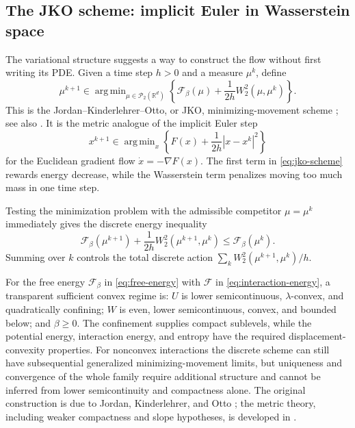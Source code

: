 \documentclass[11pt]{amsart}
\numberwithin{equation}{section}
\theoremstyle{plain}
\newcommand{\R}{\mathbb{R}}
\newcommand{\cP}{\mathcal{P}}
\DeclareMathOperator*{\argmin}{arg\,min}
\begin{document}
\subsection{The JKO scheme: implicit Euler in Wasserstein space}

The variational structure suggests a way to construct the flow without
first writing its PDE.  Given a time step $h>0$ and a measure $\mu^k$, define
\begin{equation}\label{eq:jko-scheme}
 \mu^{k+1}\in\argmin_{\mu\in\cP_2(\R^d)}
 \left\{\mathcal F_\beta(\mu)
       +\frac1{2h}W_2^2(\mu,\mu^k)\right\}.
\end{equation}
This is the Jordan--Kinderlehrer--Otto, or JKO, minimizing-movement scheme
\cite{JordanKinderlehrerOtto1998}; see also
\cite{AmbrosioGigliSavare2008}.  It is the metric analogue of the implicit
Euler step
\[
 x^{k+1}\in\argmin_x
 \left\{F(x)+\frac1{2h}|x-x^k|^2\right\}
\]
for the Euclidean gradient flow $\dot x=-\nabla F(x)$.  The first term in
\eqref{eq:jko-scheme} rewards energy decrease, while the Wasserstein term
penalizes moving too much mass in one time step.

Testing the minimization problem with the admissible competitor
$\mu=\mu^k$ immediately gives the discrete energy inequality
\begin{equation}\label{eq:jko-energy-inequality}
 \mathcal F_\beta(\mu^{k+1})
 +\frac1{2h}W_2^2(\mu^{k+1},\mu^k)
 \leq\mathcal F_\beta(\mu^k).
\end{equation}
Summing over $k$ controls the total discrete action
$\sum_k W_2^2(\mu^{k+1},\mu^k)/h$.

For the free energy $\mathcal F_\beta$ in \eqref{eq:free-energy} with $\mathcal F$  in \eqref{eq:interaction-energy}, a transparent sufficient
convex regime is: $U$ is lower semicontinuous, $\lambda$-convex, and
quadratically confining; $W$ is even, lower semicontinuous, convex, and
bounded below; and $\beta\geq0$.  The confinement supplies compact sublevels,
while the potential energy, interaction energy, and entropy have the required
displacement-convexity properties.  For nonconvex interactions the discrete scheme can still have
subsequential generalized minimizing-movement limits, but uniqueness and
convergence of the whole family require additional structure and cannot be
inferred from lower semicontinuity and compactness alone.  The original
construction is due to Jordan, Kinderlehrer, and Otto
\cite{JordanKinderlehrerOtto1998}; the metric theory, including weaker
compactness and slope hypotheses, is developed in
\cite[Chapters~2, 4, and 11]{AmbrosioGigliSavare2008}.
\end{document}
